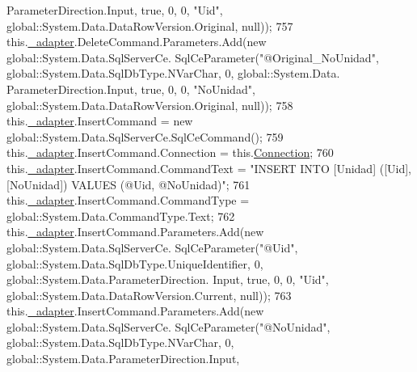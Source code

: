 \begin{DoxyCode}
      ParameterDirection.Input, \textcolor{keyword}{true}, 0, 0, \textcolor{stringliteral}{"Uid"}, global::System.Data.DataRowVersion.Original, null));
757             this.\hyperlink{class_proyecto___integrador__3_1_1ds_unidad_table_adapters_1_1_unidad_table_adapter_ab399a596bea65cb98131fe8b2f74a979}{\_adapter}.DeleteCommand.Parameters.Add(\textcolor{keyword}{new} global::System.Data.SqlServerCe.
      SqlCeParameter(\textcolor{stringliteral}{"@Original\_NoUnidad"}, global::System.Data.SqlDbType.NVarChar, 0, global::System.Data.
      ParameterDirection.Input, \textcolor{keyword}{true}, 0, 0, \textcolor{stringliteral}{"NoUnidad"}, global::System.Data.DataRowVersion.Original, null));
758             this.\hyperlink{class_proyecto___integrador__3_1_1ds_unidad_table_adapters_1_1_unidad_table_adapter_ab399a596bea65cb98131fe8b2f74a979}{\_adapter}.InsertCommand = \textcolor{keyword}{new} global::System.Data.SqlServerCe.SqlCeCommand();
759             this.\hyperlink{class_proyecto___integrador__3_1_1ds_unidad_table_adapters_1_1_unidad_table_adapter_ab399a596bea65cb98131fe8b2f74a979}{\_adapter}.InsertCommand.Connection = this.\hyperlink{class_proyecto___integrador__3_1_1ds_unidad_table_adapters_1_1_unidad_table_adapter_a13a9c13fd0ce4e17d7f35891158864db}{Connection};
760             this.\hyperlink{class_proyecto___integrador__3_1_1ds_unidad_table_adapters_1_1_unidad_table_adapter_ab399a596bea65cb98131fe8b2f74a979}{\_adapter}.InsertCommand.CommandText = \textcolor{stringliteral}{"INSERT INTO [Unidad] ([Uid], [NoUnidad])
       VALUES (@Uid, @NoUnidad)"};
761             this.\hyperlink{class_proyecto___integrador__3_1_1ds_unidad_table_adapters_1_1_unidad_table_adapter_ab399a596bea65cb98131fe8b2f74a979}{\_adapter}.InsertCommand.CommandType = global::System.Data.CommandType.Text;
762             this.\hyperlink{class_proyecto___integrador__3_1_1ds_unidad_table_adapters_1_1_unidad_table_adapter_ab399a596bea65cb98131fe8b2f74a979}{\_adapter}.InsertCommand.Parameters.Add(\textcolor{keyword}{new} global::System.Data.SqlServerCe.
      SqlCeParameter(\textcolor{stringliteral}{"@Uid"}, global::System.Data.SqlDbType.UniqueIdentifier, 0, global::System.Data.ParameterDirection.
      Input, \textcolor{keyword}{true}, 0, 0, \textcolor{stringliteral}{"Uid"}, global::System.Data.DataRowVersion.Current, null));
763             this.\hyperlink{class_proyecto___integrador__3_1_1ds_unidad_table_adapters_1_1_unidad_table_adapter_ab399a596bea65cb98131fe8b2f74a979}{\_adapter}.InsertCommand.Parameters.Add(\textcolor{keyword}{new} global::System.Data.SqlServerCe.
      SqlCeParameter(\textcolor{stringliteral}{"@NoUnidad"}, global::System.Data.SqlDbType.NVarChar, 0, global::System.Data.ParameterDirection.Input,

\end{DoxyCode}
